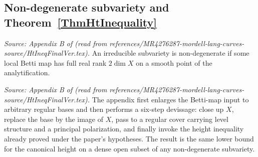 \subsection{Non-degenerate subvariety and Theorem~\ref{ThmHtInequality}}

\begin{definition}
  \label{def:nondegenerate_app}
  \textit{Source: Appendix B of \cite{MR4276287-mordell-lang-curves} (read from references/MR4276287-mordell-lang-curves-source/HtIneqFinalVer.tex).}
  An irreducible subvariety is non-degenerate if some local Betti map has full
  real rank \(2\dim X\) on a smooth point of the analytification.
\end{definition}

\begin{theorem}
  \label{thm:ht_inequality_full}
  \textit{Source: Appendix B of \cite{MR4276287-mordell-lang-curves} (read from references/MR4276287-mordell-lang-curves-source/HtIneqFinalVer.tex).}
  The appendix first enlarges the Betti-map input to arbitrary regular bases and
  then performs a six-step devissage: close up \(X\), replace the base by the
  image of \(X\), pass to a regular cover carrying level structure and a
  principal polarization, and finally invoke the height inequality already
  proved under the paper's hypotheses. The result is the same lower bound for
  the canonical height on a dense open subset of any non-degenerate subvariety.
\end{theorem}

